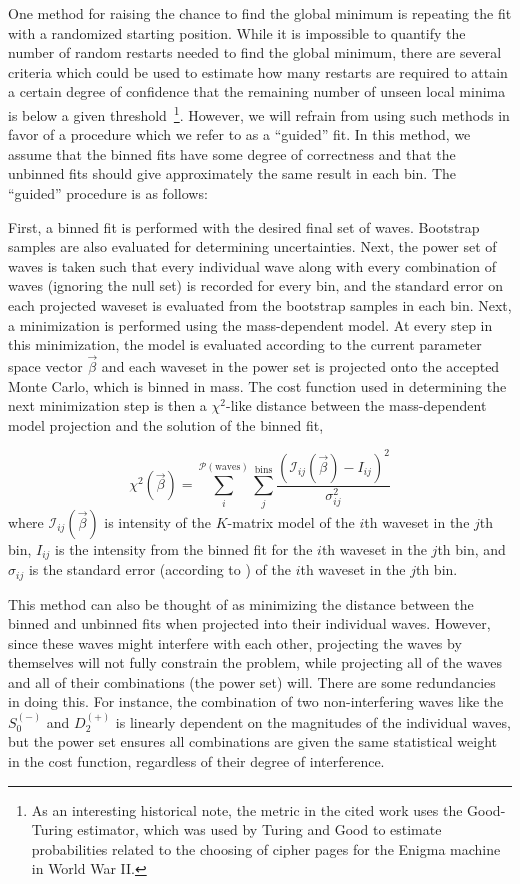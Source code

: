 One method for raising the chance to find the global minimum is repeating the fit with a randomized starting position. While it is impossible to quantify the number of random restarts needed to find the global minimum, there are several criteria which could be used to estimate how many restarts are required to attain a certain degree of confidence that the remaining number of unseen local minima is below a given threshold~\cite{Dick2014}\footnote{As an interesting historical note, the metric in the cited work uses the Good-Turing estimator, which was used by Turing and Good to estimate probabilities related to the choosing of cipher pages for the Enigma machine in World War II.}. However, we will refrain from using such methods in favor of a procedure which we refer to as a ``guided'' fit. In this method, we assume that the binned fits have some degree of correctness and that the unbinned fits should give approximately the same result in each bin. The ``guided'' procedure is as follows:

First, a binned fit is performed with the desired final set of waves. Bootstrap samples are also evaluated for determining uncertainties. Next, the power set of waves is taken such that every individual wave along with every combination of waves (ignoring the null set) is recorded for every bin, and the standard error on each projected waveset is evaluated from the bootstrap samples in each bin. Next, a minimization is performed using the mass-dependent model. At every step in this minimization, the model is evaluated according to the current parameter space vector $\vec{\beta}$ and each waveset in the power set is projected onto the accepted Monte Carlo, which is binned in mass. The cost function used in determining the next minimization step is then a $\chi^2$-like distance between the mass-dependent model projection and the solution of the binned fit,

\begin{equation}
  \chi^2(\vec{\beta}) = \sum_i^{\mathcal{P}(\text{waves})} \sum_j^{\text{bins}} \frac{(\mathcal{I}_{ij}(\vec{\beta}) - I_{ij})^2}{\sigma_{ij}^2}
\end{equation}
where $\mathcal{I}_{ij}(\vec{\beta})$ is intensity of the $K$-matrix model of the $i$th waveset in the $j$th bin, $I_{ij}$ is the intensity from the binned fit for the $i$th waveset in the $j$th bin, and $\sigma_{ij}$ is the standard error (according to ) of the $i$th waveset in the $j$th bin.

This method can also be thought of as minimizing the distance between the binned and unbinned fits when projected into their individual waves. However, since these waves might interfere with each other, projecting the waves by themselves will not fully constrain the problem, while projecting all of the waves and all of their combinations (the power set) will. There are some redundancies in doing this. For instance, the combination of two non-interfering waves like the $S_0^{(-)}$ and $D_2^{(+)}$ is linearly dependent on the magnitudes of the individual waves, but the power set ensures all combinations are given the same statistical weight in the cost function, regardless of their degree of interference.

